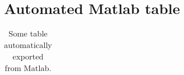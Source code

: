 \section{Automated Matlab table}\label{sec:2}
\begin{table}[H]
\caption{Some table automatically exported from Matlab.}\label{tab:matlab_table}
\centering
\begin{tabular}{|l|l|l|l|l|}
\hline

\end{tabular}
\end{table}